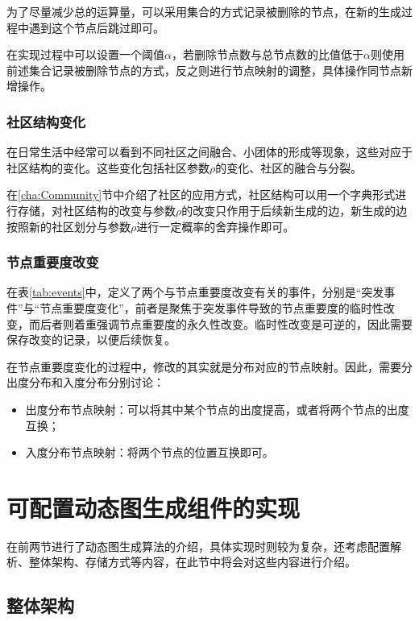 为了尽量减少总的运算量，可以采用集合的方式记录被删除的节点，在新的生成过程中遇到这个节点后跳过即可。

在实现过程中可以设置一个阈值$\alpha$，若删除节点数与总节点数的比值低于$\alpha$则使用前述集合记录被删除节点的方式，反之则进行节点映射的调整，具体操作同节点新增操作。

\subsubsection{社区结构变化}

在日常生活中经常可以看到不同社区之间融合、小团体的形成等现象，这些对应于社区结构的变化。这些变化包括社区参数$\rho$的变化、社区的融合与分裂。

在\ref{cha:Community}节中介绍了社区的应用方式，社区结构可以用一个字典形式进行存储，对社区结构的改变与参数$\rho$的改变只作用于后续新生成的边，新生成的边按照新的社区划分与参数$\rho$进行一定概率的舍弃操作即可。

\subsubsection{节点重要度改变}

在表\ref{tab:events}中，定义了两个与节点重要度改变有关的事件，分别是“突发事件”与“节点重要度变化”，前者是聚焦于突发事件导致的节点重要度的临时性改变，而后者则着重强调节点重要度的永久性改变。临时性改变是可逆的，因此需要保存改变的记录，以便后续恢复。

在节点重要度变化的过程中，修改的其实就是分布对应的节点映射。因此，需要分出度分布和入度分布分别讨论：

\begin{itemize}
  \item 出度分布节点映射：可以将其中某个节点的出度提高，或者将两个节点的出度互换；
  \item 入度分布节点映射：将两个节点的位置互换即可。
\end{itemize}

\vspace{0.2cm}

\section{可配置动态图生成组件的实现}
\label{cha:tool_implementation}

在前两节进行了动态图生成算法的介绍，具体实现时则较为复杂，还考虑配置解析、整体架构、存储方式等内容，在此节中将会对这些内容进行介绍。

\subsection{整体架构}

